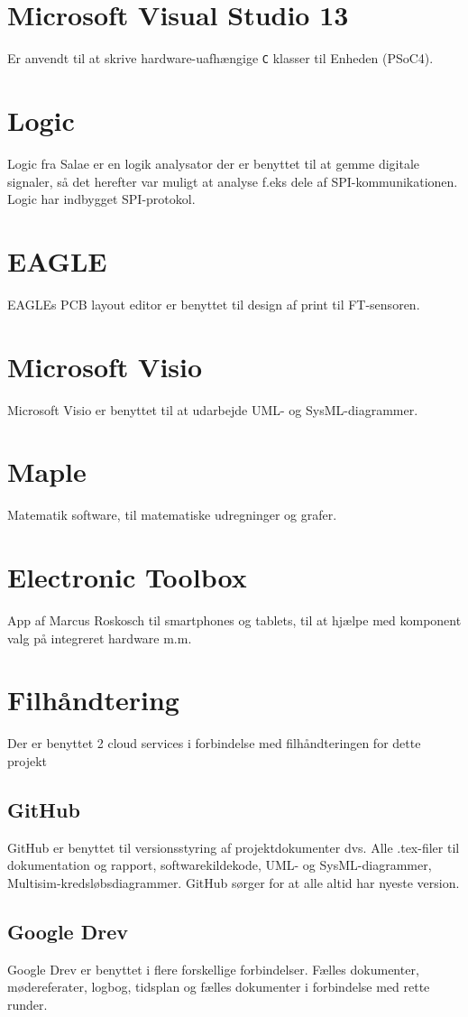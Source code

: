 \section{Microsoft Visual Studio 13}
Er anvendt til at skrive hardware-uafhængige \verb+C+ klasser til Enheden (PSoC4).

\section{Logic}
Logic fra Salae er en logik analysator der er benyttet til at gemme digitale signaler, så det herefter var muligt at analyse f.eks dele af SPI-kommunikationen. Logic har indbygget SPI-protokol.

\section{EAGLE}
EAGLEs PCB layout editor er benyttet til design af print til FT-sensoren.

\section{Microsoft Visio}
Microsoft Visio er benyttet til at udarbejde UML- og SysML-diagrammer. 

\section{Maple}
Matematik software, til matematiske udregninger og grafer.

\section{Electronic Toolbox}
App af Marcus Roskosch til smartphones og tablets, til at hjælpe med komponent valg på integreret hardware m.m. 

\section{Filhåndtering}
Der er benyttet 2 cloud services i forbindelse med filhåndteringen for dette projekt

\subsection{GitHub}
GitHub er benyttet til versionsstyring af projektdokumenter dvs. Alle .tex-filer til dokumentation og rapport, softwarekildekode, UML- og SysML-diagrammer, Multisim-kredsløbsdiagrammer. GitHub sørger for at alle altid har nyeste version. 

\subsection{Google Drev}
Google Drev er benyttet i flere forskellige forbindelser. Fælles dokumenter, mødereferater, logbog, tidsplan og fælles dokumenter i forbindelse med rette runder.